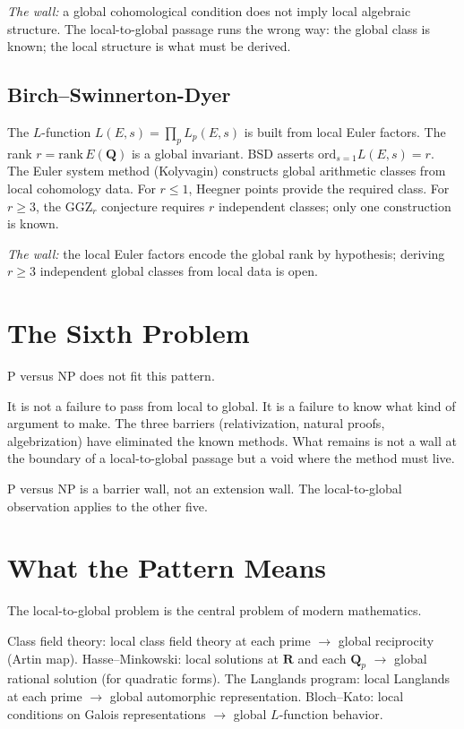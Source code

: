 \documentclass[12pt]{article}
\begin{document}
\textit{The wall:} a global cohomological condition
does not imply local algebraic structure.
The local-to-global passage runs the wrong way:
the global class is known; the local structure is what must be derived.

\subsection*{Birch--Swinnerton-Dyer}

The $L$-function $L(E,s) = \prod_p L_p(E,s)$
is built from local Euler factors.
The rank $r = \mathrm{rank}\,E(\mathbf{Q})$ is a global invariant.
BSD asserts $\mathrm{ord}_{s=1} L(E,s) = r$.
The Euler system method (Kolyvagin) constructs global arithmetic classes
from local cohomology data.
For $r \leq 1$, Heegner points provide the required class.
For $r \geq 3$, the GGZ$_r$ conjecture requires $r$ independent classes;
only one construction is known.

\textit{The wall:} the local Euler factors encode the global rank by hypothesis;
deriving $r \geq 3$ independent global classes from local data is open.

\section{The Sixth Problem}

P versus NP does not fit this pattern.

It is not a failure to pass from local to global.
It is a failure to know what kind of argument to make.
The three barriers (relativization, natural proofs, algebrization)
have eliminated the known methods.
What remains is not a wall at the boundary of a local-to-global passage
but a void where the method must live.

P versus NP is a barrier wall, not an extension wall.
The local-to-global observation applies to the other five.

\section{What the Pattern Means}

The local-to-global problem is the central problem of modern mathematics.

Class field theory: local class field theory at each prime
$\to$ global reciprocity (Artin map).
Hasse--Minkowski: local solutions at $\mathbf{R}$ and each $\mathbf{Q}_p$
$\to$ global rational solution (for quadratic forms).
The Langlands program: local Langlands at each prime
$\to$ global automorphic representation.
Bloch--Kato: local conditions on Galois representations
$\to$ global $L$-function behavior.
\end{document}
